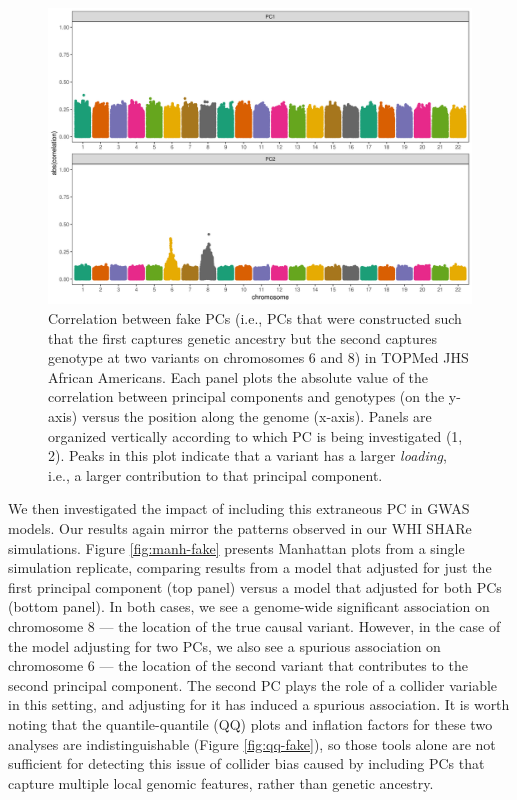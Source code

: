 \documentclass[12pt]{article}
\begin{document}
\begin{figure}[!htb]
\centering
\includegraphics[width=\textwidth]{figs/finalfigs/figS11_fake_pcs_corr_1}
\caption[Correlation between fake PCs and genotypes in TOPMed JHS.]{Correlation between fake PCs (i.e., PCs that were constructed such that the first captures genetic ancestry but the second captures genotype at two variants on chromosomes 6 and 8) in TOPMed JHS African Americans. Each panel plots the absolute value of the correlation between principal components and genotypes (on the y-axis) versus the position along the genome (x-axis).  Panels are organized vertically according to which PC is being investigated (1, 2). Peaks in this plot indicate that a variant has a larger \textit{loading}, i.e., a larger contribution to that principal component.}
\label{fig:corr-fake}
\end{figure}


We then investigated the impact of including this extraneous PC in GWAS models. 
Our results again mirror the patterns observed in our WHI SHARe simulations.
Figure \ref{fig:manh-fake} presents Manhattan plots from a single simulation replicate, comparing results from a model that adjusted for just the first principal component (top panel) versus a model that adjusted for both PCs (bottom panel).
In both cases, we see a genome-wide significant association on chromosome 8 --- the location of the true causal variant.
However, in the case of the model adjusting for two PCs, we also see a spurious association on chromosome 6 --- the location of the second variant that contributes to the second principal component.
The second PC plays the role of a collider variable in this setting, and adjusting for it has induced a spurious association.
It is worth noting that the quantile-quantile (QQ) plots and inflation factors for these two analyses are indistinguishable (Figure \ref{fig:qq-fake}), so those tools alone are not sufficient for detecting this issue of collider bias caused by including PCs that capture multiple local genomic features, rather than genetic ancestry.
\end{document}
